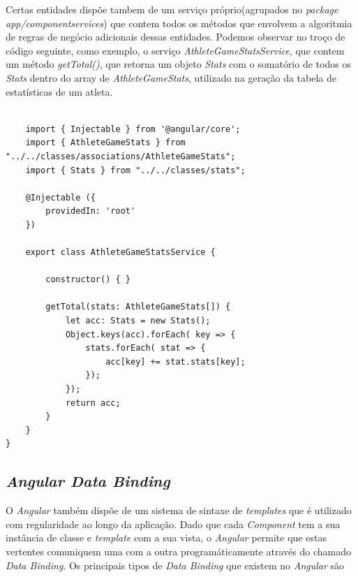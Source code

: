 Certas entidades dispõe tambem de um serviço próprio(agrupados no \textit{package} \textit{app/componentservices}) que contem todos os métodos que envolvem a algoritmia de regras de negócio adicionais dessas entidades. 
Podemos observar no troço de código seguinte, como exemplo, o serviço \textit{AthleteGameStatsService}, que contem um método \textit{getTotal()}, que retorna um objeto \textit{Stats} com o somatório de todos os \textit{Stats} dentro do array de \textit{AthleteGameStats}, utilizado na geração da tabela de estatísticas de um atleta. 

\begin{lstlisting}

	import { Injectable } from '@angular/core';
	import { AthleteGameStats } from "../../classes/associations/AthleteGameStats";
	import { Stats } from "../../classes/stats";
	
	@Injectable ({
		providedIn: 'root'
	})
	
	export class AthleteGameStatsService {
	
		constructor() { }
	
		getTotal(stats: AthleteGameStats[]) {
			let acc: Stats = new Stats();
			Object.keys(acc).forEach( key => {
				stats.forEach( stat => {
					acc[key] += stat.stats[key];
				});
			});
			return acc;
		}
	}
}
\end{lstlisting}

\newpage

\subsection{\textit{Angular Data Binding}}\label{subsec413}

O \textit{Angular} também dispõe de um sistema de sintaxe de \textit{templates} que é utilizado com regularidade ao longo da aplicação. Dado que cada \textit{Component} tem a sua instância de classe e \textit{template} com a sua vista, o \textit{Angular} permite que estas vertentes comuniquem uma com a outra programáticamente através do chamado \textit{Data Binding}. 
Os principais tipos de \textit{Data Binding} que existem no \textit{Angular} são \\

